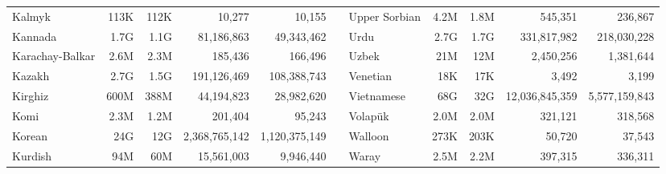 \begin{table*}[t!]
{\begin{tabular}{@{}lrrrrclrrrr@{}}
            Kalmyk                    & 113K                     & 112K                      & 10,277                   & 10,155                    &                          & Upper Sorbian             & 4.2M                     & 1.8M                      & 545,351                  & 236,867                   \\
            Kannada                   & 1.7G                     & 1.1G                      & 81,186,863               & 49,343,462                &                          & Urdu                      & 2.7G                     & 1.7G                      & 331,817,982              & 218,030,228               \\
            Karachay-Balkar           & 2.6M                     & 2.3M                      & 185,436                  & 166,496                   &                          & Uzbek                     & 21M                      & 12M                       & 2,450,256                & 1,381,644                 \\
            Kazakh                    & 2.7G                     & 1.5G                      & 191,126,469              & 108,388,743               &                          & Venetian                  & 18K                      & 17K                       & 3,492                    & 3,199                     \\
            Kirghiz                   & 600M                     & 388M                      & 44,194,823               & 28,982,620                &                          & Vietnamese                & 68G                      & 32G                       & 12,036,845,359           & 5,577,159,843             \\
            Komi                      & 2.3M                     & 1.2M                      & 201,404                  & 95,243                    &                          & Volapük                   & 2.0M                     & 2.0M                      & 321,121                  & 318,568                   \\
            Korean                    & 24G                      & 12G                       & 2,368,765,142            & 1,120,375,149             &                          & Walloon                   & 273K                     & 203K                      & 50,720                   & 37,543                    \\
            Kurdish                   & 94M                      & 60M                       & 15,561,003               & 9,946,440                 &                          & Waray                     & 2.5M                     & 2.2M                      & 397,315                  & 336,311                   \\

\end{tabular}}
\end{table*}
